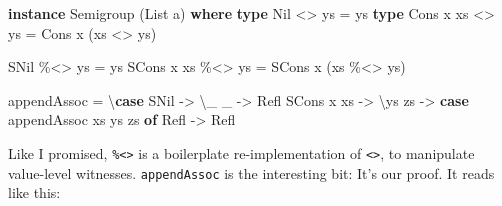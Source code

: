 \documentclass[]{article}
\newenvironment{Shaded}{}{}
\newcommand{\DataTypeTok}[1]{\textcolor[rgb]{0.56,0.13,0.00}{#1}}
\newcommand{\KeywordTok}[1]{\textcolor[rgb]{0.00,0.44,0.13}{\textbf{#1}}}
\newcommand{\NormalTok}[1]{#1}
\newcommand{\OperatorTok}[1]{\textcolor[rgb]{0.40,0.40,0.40}{#1}}
\newcommand{\OtherTok}[1]{\textcolor[rgb]{0.00,0.44,0.13}{#1}}
\begin{document}
\begin{Shaded}
\begin{Highlighting}[]
\KeywordTok{instance} \DataTypeTok{Semigroup}\NormalTok{ (}\DataTypeTok{List}\NormalTok{ a) }\KeywordTok{where}
    \KeywordTok{type} \DataTypeTok{Nil}       \OperatorTok{<>}\NormalTok{ ys }\OtherTok{=}\NormalTok{ ys}
    \KeywordTok{type} \DataTypeTok{Cons}\NormalTok{ x xs }\OperatorTok{<>}\NormalTok{ ys }\OtherTok{=} \DataTypeTok{Cons}\NormalTok{ x (xs }\OperatorTok{<>}\NormalTok{ ys)}

    \DataTypeTok{SNil}       \OperatorTok{\%<>}\NormalTok{ ys }\OtherTok{=}\NormalTok{ ys}
    \DataTypeTok{SCons}\NormalTok{ x xs }\OperatorTok{\%<>}\NormalTok{ ys }\OtherTok{=} \DataTypeTok{SCons}\NormalTok{ x (xs }\OperatorTok{\%<>}\NormalTok{ ys)}

\NormalTok{    appendAssoc }\OtherTok{=}\NormalTok{ \textbackslash{}}\KeywordTok{case}
      \DataTypeTok{SNil}       \OtherTok{{-}>}\NormalTok{ \textbackslash{}\_ \_ }\OtherTok{{-}>} \DataTypeTok{Refl}
      \DataTypeTok{SCons}\NormalTok{ x xs }\OtherTok{{-}>}\NormalTok{ \textbackslash{}ys zs }\OtherTok{{-}>}
        \KeywordTok{case}\NormalTok{ appendAssoc xs ys zs }\KeywordTok{of}
          \DataTypeTok{Refl} \OtherTok{{-}>} \DataTypeTok{Refl}
\end{Highlighting}
\end{Shaded}

Like I promised, \texttt{\%\textless{}\textgreater{}} is a boilerplate
re-implementation of \texttt{\textless{}\textgreater{}}, to manipulate
value-level witnesses. \texttt{appendAssoc} is the interesting bit: It's our
proof. It reads like this:
\end{document}

